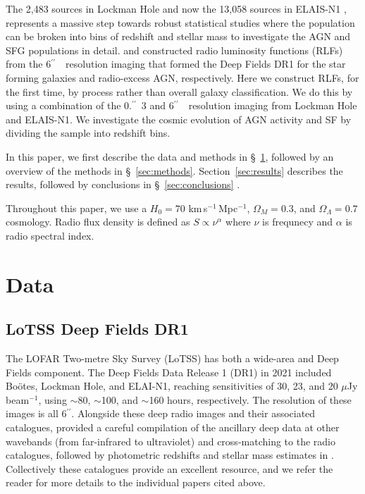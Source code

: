 \documentclass[usenatbib,fleqn,letters]{mnras}
\newcommand{\sarc}{$^{\prime\prime}\!\!$}
\newcommand{\muJybm}{$\mu$Jy$\,$beam$^{-1}$}
\begin{document}
The 2,483 sources in Lockman Hole \citep{sweijen_deep_2022} and now the 13,058 sources in ELAIS-N1 \citep{de_jong_into_2024}, represents a massive step towards robust statistical studies where the population can be broken into bins of redshift and stellar mass to investigate the AGN and SFG populations in detail. \cite{cochrane_lofar_2023} and \cite{kondapally_cosmic_2022} constructed radio luminosity functions (RLFs) from the 6\sarc\ \ resolution imaging that formed the Deep Fields DR1 for the star forming galaxies and radio-excess AGN, respectively. Here we construct RLFs, for the first time, by process rather than overall galaxy classification. We do this by using a combination of the 0.\sarc\ 3 and 6\sarc\ \ resolution imaging from Lockman Hole and ELAIS-N1. We investigate the cosmic evolution of AGN activity and SF by dividing the sample into redshift bins. 

In this paper, we first describe the data and methods in \S~\ref{sec:data}, followed by an overview of the methods in \S~\ref{sec:methods}. Section~\ref{sec:results} describes the results, followed by 
conclusions in 
\S~\ref{sec:conclusions}
.

Throughout this paper, we use a $H_0 = 70$ km$\,$s$^{-1}\,$Mpc$^{-1}$, $\Omega_M = 0.3$, and $\Omega_{\Lambda}= 0.7$ cosmology. Radio flux density is defined as $S\propto \nu^{\alpha}$ where $\nu$ is frequnecy and $\alpha$ is radio spectral index. 


\section{Data}
\label{sec:data}

\subsection{LoTSS Deep Fields DR1}
\label{subsec:dr1}
The LOFAR Two-metre Sky Survey (LoTSS) has both a wide-area \citep{shimwell_lofar_2017,shimwell_lofar_2021,shimwell_lofar_2022} and Deep Fields \citep{tasse_lofar_2021,sabater_lofar_2021} component. The Deep Fields Data Release 1 (DR1) in 2021 included Boötes, Lockman Hole, and ELAI-N1, reaching sensitivities of 30, 23, and 20 \muJybm , using $\sim$80, $\sim$100, and $\sim$160 hours, respectively. The resolution of these images is all 6\sarc . Alongside these deep radio images and their associated catalogues, \cite{kondapally_lofar_2021} provided a careful compilation of the ancillary deep data at other wavebands (from far-infrared to ultraviolet) and cross-matching to the radio catalogues, followed by photometric redshifts and stellar mass estimates in \cite{duncan_lofar_2021}. Collectively these catalogues provide an excellent resource, and we refer the reader for more details to the individual papers cited above.
\end{document}
